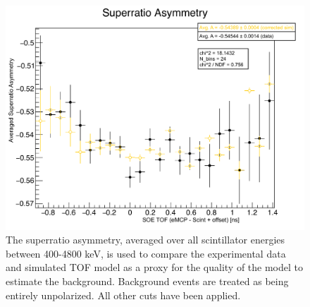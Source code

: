 \begin{figure}[h!tb]
	\centering
	\includegraphics[width=.999\linewidth]
	{Figures/asymmetry_by_tof.pdf}
	\caption[Averaged Superratio Asymmetry by TOF]{The superratio asymmetry, averaged over all scintillator energies between 400-4800 keV, is used to compare the experimental data and simulated TOF model as a proxy for the quality of the model to estimate the background.  Background events are treated as being entirely unpolarized.  All other cuts have been applied.}	
	\label{fig:asymmetry_by_tof}
\end{figure}





